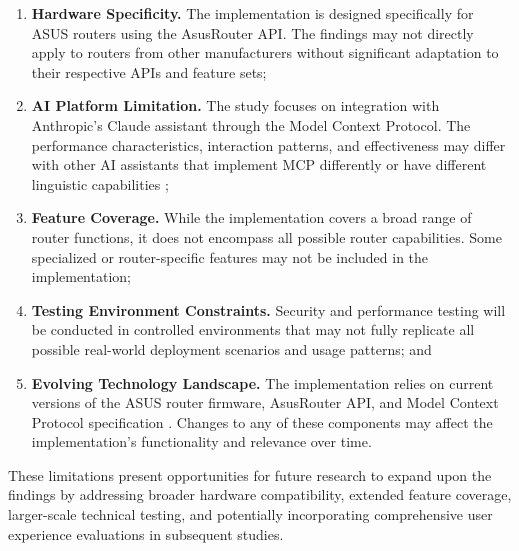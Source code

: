 \begin{enumerate}
\item \textbf{Hardware Specificity.} The implementation is designed specifically for ASUS routers using the AsusRouter API. The findings may not directly apply to routers from other manufacturers without significant adaptation to their respective APIs and feature sets;

\item \textbf{AI Platform Limitation.} The study focuses on integration with Anthropic's Claude assistant through the Model Context Protocol. The performance characteristics, interaction patterns, and effectiveness may differ with other AI assistants that implement MCP differently or have different linguistic capabilities \cite{mcp_byteplus};

\item \textbf{Feature Coverage.} While the implementation covers a broad range of router functions, it does not encompass all possible router capabilities. Some specialized or router-specific features may not be included in the implementation;

\item \textbf{Testing Environment Constraints.} Security and performance testing will be conducted in controlled environments that may not fully replicate all possible real-world deployment scenarios and usage patterns; and

\item \textbf{Evolving Technology Landscape.} The implementation relies on current versions of the ASUS router firmware, AsusRouter API, and Model Context Protocol specification \cite{mcp_developer}. Changes to any of these components may affect the implementation's functionality and relevance over time.
\end{enumerate}
These limitations present opportunities for future research to expand upon the findings by addressing broader hardware compatibility, extended feature coverage, larger-scale technical testing, and potentially incorporating comprehensive user experience evaluations in subsequent studies.
